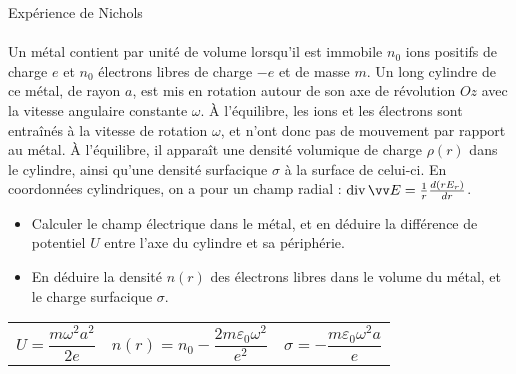 \documentclass[french, a4paper, 11pt]{article}
\DeclareMathOperator{\diverg}{div}        %
\begin{document}
\begin{cadre}{Expérience de Nichols}
  \paragraph*{}
  Un métal contient par unité de volume lorsqu'il est immobile $n_{0}$ ions positifs de charge $e$ et $n_{0}$ électrons libres de charge $-e$ et de masse $m$. Un long cylindre de ce métal, de rayon $a$, est mis en rotation autour de son axe de révolution $Oz$ avec la vitesse angulaire constante $\omega$. À l'équilibre, les ions et les électrons sont entraînés à la vitesse de rotation $\omega$, et n'ont donc pas de mouvement par rapport au métal. À l'équilibre, il apparaît une densité volumique de charge $\rho(r)$ dans le cylindre, ainsi qu'une densité surfacique $\sigma$ à la surface de celui-ci. En coordonnées cylindriques, on a pour un champ radial : $\diverg \vv E = \frac{1}{r}\frac{d(rE_{r})}{dr}$.
  \begin{itemize}[label=$\bullet$]
    \item Calculer le champ électrique dans le métal, et en déduire la différence de potentiel $U$ entre l'axe du cylindre et sa périphérie.
    \item En déduire la densité $n(r)$ des électrons libres dans le volume du métal, et le charge surfacique $\sigma$.
  \end{itemize}
  \tcblower
  \begin{tabularx}{\linewidth}{XXr}
    $U = \dfrac{m\omega^{2}a^{2}}{2e}$ &
    $n(r) = n_{0} - \dfrac{2m\varepsilon_{0}\omega^{2}}{e^{2}}$ &
    $\sigma = -\dfrac{m\varepsilon_{0}\omega^{2}a}{e}$
  \end{tabularx}
\end{cadre}
\end{document}
